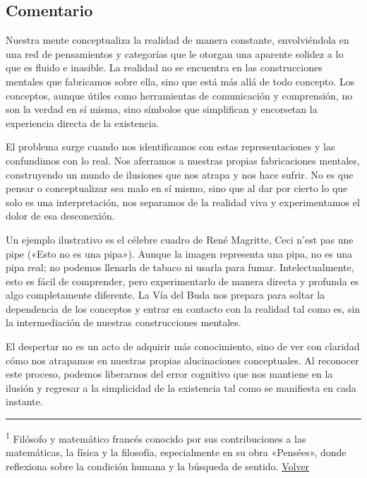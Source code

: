 \documentclass[
  a5paperpaper,
]{article}
\begin{document}
\hfill\break

\hypertarget{comentario-14}{%
\subsection{Comentario}\label{comentario-14}}

Nuestra mente conceptualiza la realidad de manera constante,
envolviéndola en una red de pensamientos y categorías que le otorgan una
aparente solidez a lo que es fluido e inasible. La realidad no se
encuentra en las construcciones mentales que fabricamos sobre ella, sino
que está más allá de todo concepto. Los conceptos, aunque útiles como
herramientas de comunicación y comprensión, no son la verdad en sí
misma, sino símbolos que simplifican y encorsetan la experiencia directa
de la existencia.

El problema surge cuando nos identificamos con estas representaciones y
las confundimos con lo real. Nos aferramos a nuestras propias
fabricaciones mentales, construyendo un mundo de ilusiones que nos
atrapa y nos hace sufrir. No es que pensar o conceptualizar sea malo en
sí mismo, sino que al dar por cierto lo que solo es una interpretación,
nos separamos de la realidad viva y experimentamos el dolor de esa
desconexión.

Un ejemplo ilustrativo es el célebre cuadro de René Magritte, Ceci n'est
pas une pipe («Esto no es una pipa»). Aunque la imagen representa una
pipa, no es una pipa real; no podemos llenarla de tabaco ni usarla para
fumar. Intelectualmente, esto es fácil de comprender, pero
experimentarlo de manera directa y profunda es algo completamente
diferente. La Vía del Buda nos prepara para soltar la dependencia de los
conceptos y entrar en contacto con la realidad tal como es, sin la
intermediación de nuestras construcciones mentales.

El despertar no es un acto de adquirir más conocimiento, sino de ver con
claridad cómo nos atrapamos en nuestras propias alucinaciones
conceptuales. Al reconocer este proceso, podemos liberarnos del error
cognitivo que nos mantiene en la ilusión y regresar a la simplicidad de
la existencia tal como se manifiesta en cada instante.

\hfill\break

\begin{center}\rule{0.5\linewidth}{0.5pt}\end{center}

\leavevmode{}%
\textsuperscript{1} Filósofo y matemático francés conocido por sus
contribuciones a las matemáticas, la física y la filosofía,
especialmente en su obra «Pensées», donde reflexiona sobre la condición
humana y la búsqueda de sentido. \protect\hyperlink{ref1}{Volver}
\end{document}
